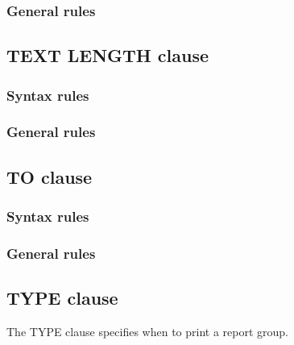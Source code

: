 \subsubsection{General rules}

\subsection{TEXT LENGTH clause}

\begin{syntax}[\deletedcolour]
\end{syntax}

\subsubsection{Syntax rules}

\subsubsection{General rules}

\subsection{TO clause}

\begin{syntax}
   \identifier
\end{syntax}

\subsubsection{Syntax rules}

\subsubsection{General rules}

\subsection{TYPE clause}

The TYPE clause specifies when to print a report group.

